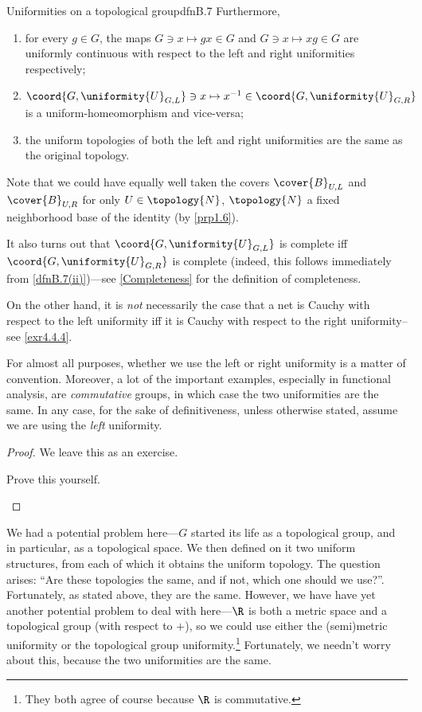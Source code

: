 \begin{prp}{Uniformities on a topological group}{dfnB.7}
Furthermore,
\begin{enumerate}
\item \label{dfnB.7(i)}for every $g\in G$, the maps $G\ni x\mapsto gx\in G$ and $G\ni x\mapsto xg\in G$ are uniformly continuous with respect to the left and right uniformities respectively;
\item \label{dfnB.7(ii)}$\coord{G,\uniformity{U}_{G,L}}\ni x\mapsto x^{-1}\in \coord{G,\uniformity{U}_{G,R}}$ is a uniform-homeomorphism and vice-versa;
\item \label{dfnB.7(iii)}the uniform topologies of both the left and right uniformities are the same as the original topology.
\end{enumerate}
\begin{rmk}
Note that we could have equally well taken the covers $\cover{B}_{U,L}$ and $\cover{B}_{U,R}$ for only $U\in \topology{N}$, $\topology{N}$ a fixed neighborhood base of the identity (by \cref{prp1.6}).
\end{rmk}
\begin{rmk}
It also turns out that $\coord{G,\uniformity{U}_{G,L}}$ is complete iff $\coord{G,\uniformity{U}_{G,R}}$ is complete (indeed, this follows immediately from \cref{dfnB.7(ii)})---see \cref{Completeness} for the definition of completeness.
\end{rmk}
\begin{rmk}
On the other hand, it is \emph{not} necessarily the case that a net is Cauchy with respect to the left uniformity iff it is Cauchy with respect to the right uniformity--see \cref{exr4.4.4}.
\end{rmk}
\begin{rmk}
For almost all purposes, whether we use the left or right uniformity is a matter of convention.  Moreover, a lot of the important examples, especially in functional analysis, are \emph{commutative} groups, in which case the two uniformities are the same.  In any case, for the sake of definitiveness, unless otherwise stated, assume we are using the \emph{left} uniformity.
\end{rmk}
\begin{proof}
We leave this as an exercise.
\begin{exr}[breakable=false]{}{}
Prove this yourself.
\end{exr}
\end{proof}
\end{prp}
We had a potential problem here---$G$ started its life as a topological group, and in particular, as a topological space.  We then defined on it two uniform structures, from each of which it obtains the uniform topology.  The question arises:  ``Are these topologies the same, and if not, which one should we use?''.  Fortunately, as stated above, they are the same.  However, we have have yet another potential problem to deal with here---$\R$ is both a metric space and a topological group (with respect to $+$), so we could use either the (semi)metric uniformity or the topological group uniformity.\footnote{They both agree of course because $\R$ is commutative.}  Fortunately, we needn't worry about this, because the two uniformities are the same.
